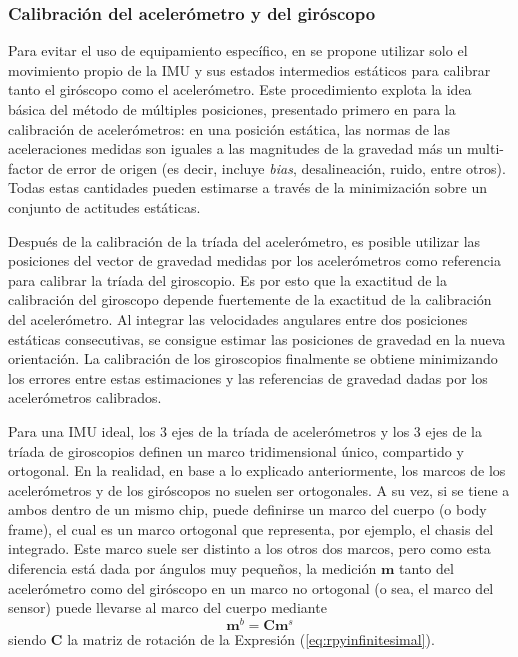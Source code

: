 \subsubsection{Calibración del acelerómetro y del giróscopo}
Para evitar el uso de equipamiento específico, en \cite{tedaldi2014} se propone utilizar solo el movimiento propio de la IMU y sus estados intermedios estáticos para calibrar tanto el giróscopo como el acelerómetro. Este procedimiento explota la idea básica del método de múltiples posiciones, presentado primero en \cite{lotters1998} para la calibración de acelerómetros: en una posición estática, las normas de las aceleraciones medidas son iguales a las magnitudes de la gravedad más un multi-factor de error de origen (es decir, incluye \textit{bias}, desalineación, ruido, entre otros). Todas estas cantidades pueden estimarse a través de la minimización sobre un conjunto de actitudes estáticas. 

Después de la calibración de la tríada del acelerómetro, es posible utilizar las posiciones del vector de gravedad medidas por los acelerómetros como referencia para calibrar la tríada del giroscopio. Es por esto que la exactitud de la calibración del giroscopo depende fuertemente de la exactitud de la calibración del acelerómetro. Al integrar las velocidades angulares entre dos posiciones estáticas consecutivas, se consigue estimar las posiciones de gravedad en la nueva orientación. La calibración de los giroscopios finalmente se obtiene minimizando los errores entre estas estimaciones y las referencias de gravedad dadas por los acelerómetros calibrados.

Para una IMU ideal, los 3 ejes de la tríada de acelerómetros y los 3 ejes de la tríada de giroscopios definen un marco tridimensional único, compartido y ortogonal. En la realidad, en base a lo explicado anteriormente, los marcos de los acelerómetros y de los giróscopos no suelen ser ortogonales. A su vez, si se tiene a ambos dentro de un mismo chip, puede definirse un marco del cuerpo (o body frame), el cual es un marco ortogonal que representa, por ejemplo, el chasis del integrado. Este marco suele ser distinto a los otros dos marcos, pero como esta diferencia está dada por ángulos muy pequeños, la medición $\bm{m}$ tanto del acelerómetro como del giróscopo en un marco no ortogonal (o sea, el marco del sensor) puede llevarse al marco del cuerpo mediante
\begin{equation}
    \bm{m}^b = \bm{C}\bm{m}^s
\end{equation}
siendo $\bm{C}$ la matriz de rotación de la Expresión (\ref{eq:rpyinfinitesimal}).

